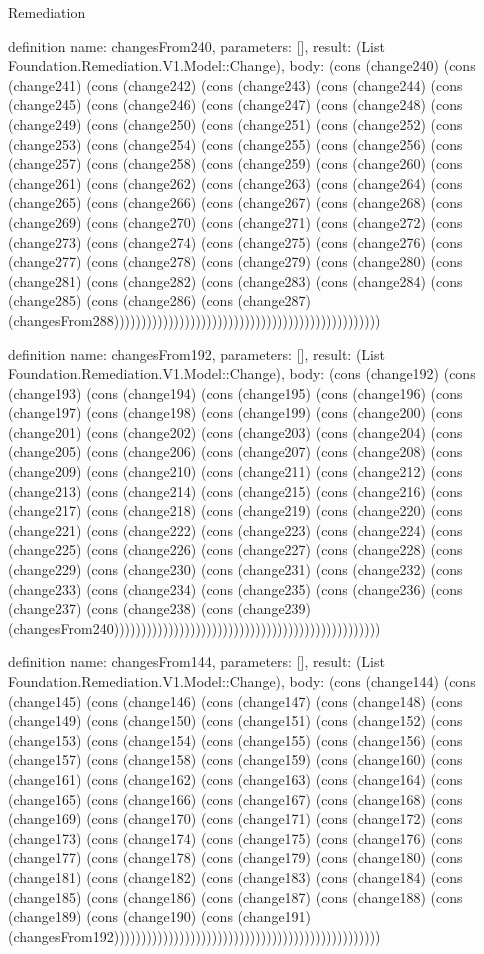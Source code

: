 \begin{lexlean}{Remediation}
\begin{semanticmodule}
definition{
  name: changesFrom240,
  parameters: [],
  result: (List Foundation.Remediation.V1.Model::Change),
  body: (cons (change240) (cons (change241) (cons (change242) (cons (change243) (cons (change244) (cons (change245) (cons (change246) (cons (change247) (cons (change248) (cons (change249) (cons (change250) (cons (change251) (cons (change252) (cons (change253) (cons (change254) (cons (change255) (cons (change256) (cons (change257) (cons (change258) (cons (change259) (cons (change260) (cons (change261) (cons (change262) (cons (change263) (cons (change264) (cons (change265) (cons (change266) (cons (change267) (cons (change268) (cons (change269) (cons (change270) (cons (change271) (cons (change272) (cons (change273) (cons (change274) (cons (change275) (cons (change276) (cons (change277) (cons (change278) (cons (change279) (cons (change280) (cons (change281) (cons (change282) (cons (change283) (cons (change284) (cons (change285) (cons (change286) (cons (change287) (changesFrom288)))))))))))))))))))))))))))))))))))))))))))))))))
}

definition{
  name: changesFrom192,
  parameters: [],
  result: (List Foundation.Remediation.V1.Model::Change),
  body: (cons (change192) (cons (change193) (cons (change194) (cons (change195) (cons (change196) (cons (change197) (cons (change198) (cons (change199) (cons (change200) (cons (change201) (cons (change202) (cons (change203) (cons (change204) (cons (change205) (cons (change206) (cons (change207) (cons (change208) (cons (change209) (cons (change210) (cons (change211) (cons (change212) (cons (change213) (cons (change214) (cons (change215) (cons (change216) (cons (change217) (cons (change218) (cons (change219) (cons (change220) (cons (change221) (cons (change222) (cons (change223) (cons (change224) (cons (change225) (cons (change226) (cons (change227) (cons (change228) (cons (change229) (cons (change230) (cons (change231) (cons (change232) (cons (change233) (cons (change234) (cons (change235) (cons (change236) (cons (change237) (cons (change238) (cons (change239) (changesFrom240)))))))))))))))))))))))))))))))))))))))))))))))))
}

definition{
  name: changesFrom144,
  parameters: [],
  result: (List Foundation.Remediation.V1.Model::Change),
  body: (cons (change144) (cons (change145) (cons (change146) (cons (change147) (cons (change148) (cons (change149) (cons (change150) (cons (change151) (cons (change152) (cons (change153) (cons (change154) (cons (change155) (cons (change156) (cons (change157) (cons (change158) (cons (change159) (cons (change160) (cons (change161) (cons (change162) (cons (change163) (cons (change164) (cons (change165) (cons (change166) (cons (change167) (cons (change168) (cons (change169) (cons (change170) (cons (change171) (cons (change172) (cons (change173) (cons (change174) (cons (change175) (cons (change176) (cons (change177) (cons (change178) (cons (change179) (cons (change180) (cons (change181) (cons (change182) (cons (change183) (cons (change184) (cons (change185) (cons (change186) (cons (change187) (cons (change188) (cons (change189) (cons (change190) (cons (change191) (changesFrom192)))))))))))))))))))))))))))))))))))))))))))))))))
}


\end{semanticmodule}
\end{lexlean}
